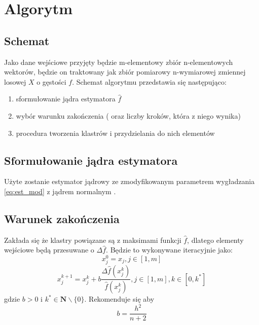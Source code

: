 
\section{Algorytm}
\label{sec:algorytm}
\subsection{Schemat}
\label{subsec:schemat}
Jako dane wejściowe przyjęty będzie m-elementowy zbiór n-elementowych wektorów, będzie on traktowany jak zbiór pomiarowy n-wymiarowej zmiennej losowej $X$ o gęstości $f$.
Schemat algorytmu przedstawia się następująco:
\begin{enumerate}
\item sformułowanie jądra estymatora $\hat{f}$
\item wybór warunku zakończenia ( oraz liczby kroków, która z niego wynika)
\item procedura tworzenia klastrów i przydzielania do nich elementów
\end{enumerate}

\subsection{Sformułowanie jądra estymatora}
\label{subsec:jadro_estymatora}
Użyte zostanie estymator jądrowy ze zmodyfikowanym parametrem wygładzania \eqref{eq:est_mod} z jądrem normalnym \cite{Kul10}.
\subsection{Warunek zakończenia}
\label{subsec:stop_cond}
Zakłada się że klastry powiązane są z maksimami funkcji $\hat{
f}$, dlatego elementy wejściowe będą przesuwane o $\Delta\hat{f}$. Będzie to wykonywane iteracyjnie jako:
\begin{equation}
x^0_j=x_j, j\in [1,m]
\end{equation}
\begin{equation} \label{eq:dist_set}
x^{k+1}_j=x^k_j+b\frac{\Delta\hat{f}(x^k_j)}{\hat{f}(x^k_j)}, j \in [1,m], k \in [0,k^*]
\end{equation}
gdzie $b > 0$ i $k^* \in \mathbf{N} \backslash \{0\}$. Rekomenduje się aby
\begin{equation}
b=\frac{h^2}{n+2}
\end{equation} 


